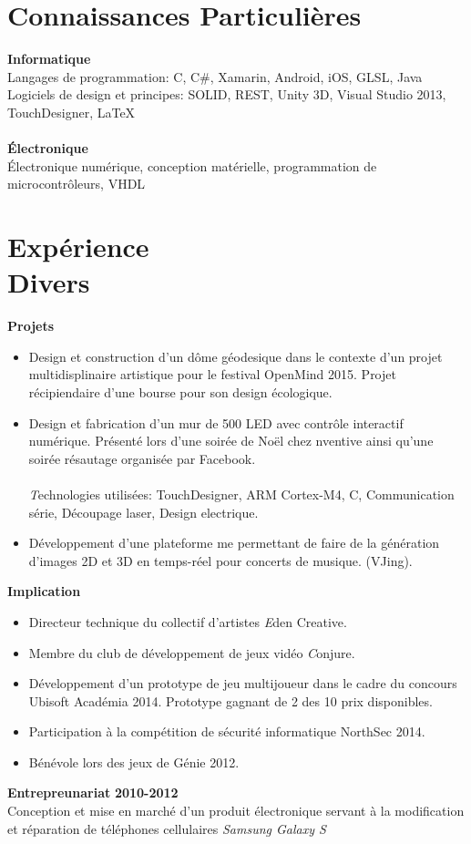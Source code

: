 \documentclass[margin,line]{res}
\begin{document}
\begin{resume}

\section{\sc Connaissances Particulières}

{\bf Informatique} \\
Langages de programmation: C, C\#, Xamarin, Android, iOS, GLSL, Java\\
Logiciels de design et principes: SOLID, REST, Unity 3D, Visual Studio 2013, TouchDesigner, \LaTeX \\\\
{\bf Électronique} \\
Électronique numérique, conception matérielle, programmation de microcontrôleurs, VHDL


\section{\sc Expérience\\ Divers}
{\bf Projets}\hfill
\begin{itemize}
\item Design et construction d'un dôme géodesique dans le contexte d'un projet multidisplinaire artistique pour le festival OpenMind 2015. Projet récipiendaire d'une bourse pour son design écologique.
\item Design et fabrication d'un mur de 500 LED avec contrôle interactif numérique. Présenté lors d'une soirée de Noël chez nventive ainsi qu'une soirée résautage organisée par Facebook.
\\\\{\emph Technologies utilisées:} TouchDesigner, ARM Cortex-M4, C, Communication série, Découpage laser, Design electrique.
\item Développement d'une plateforme me permettant de faire de la génération d'images 2D et 3D en temps-réel pour concerts de musique. (VJing).
\end{itemize}
{\bf Implication} \hfill
\begin{itemize}
\item Directeur technique du collectif d'artistes {\emph Eden Creative}.
\item Membre du club de développement de jeux vidéo {\emph Conjure}.
\item Développement d'un prototype de jeu multijoueur dans le cadre du concours Ubisoft Académia 2014. Prototype gagnant de 2 des 10 prix disponibles.
\item Participation à la compétition de sécurité informatique NorthSec 2014.
\item Bénévole lors des jeux de Génie 2012.
\end{itemize}
{\bf Entrepreunariat} \hfill{\bf 2010-2012}\\
Conception et mise en marché d'un produit électronique servant à la modification et réparation de téléphones cellulaires \emph{Samsung Galaxy S}


\end{resume}
\end{document}
